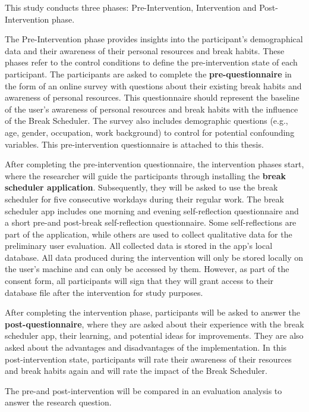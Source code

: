 \documentclass{hasel_thesis}
\begin{document}
This study conducts three phases: Pre-Intervention, Intervention and Post-Intervention phase. 

The Pre-Intervention phase provides insights into the participant's demographical data and their awareness of their personal resources and break habits. These phases refer to the control conditions to define the pre-intervention state of each participant. The participants are asked to complete the \textbf{pre-questionnaire} in the form of an online survey with questions about their existing break habits and awareness of personal resources. This questionnaire should represent the baseline of the user's awareness of personal resources and break habits with the influence of the Break Scheduler. The survey also includes demographic questions (e.g., age, gender, occupation, work background) to control for potential confounding variables. This pre-intervention questionnaire is attached to this thesis.

After completing the pre-intervention questionnaire, the intervention phases start, where the researcher will guide the participants through installing the \textbf{break scheduler application}. Subsequently, they will be asked to use the break scheduler for five consecutive workdays during their regular work. The break scheduler app includes one morning and evening self-reflection questionnaire and a short pre-and post-break self-reflection questionnaire. Some self-reflections are part of the application, while others are used to collect qualitative data for the preliminary user evaluation. All collected data is stored in the app's local database. All data produced during the intervention will only be stored locally on the user's machine and can only be accessed by them. However, as part of the consent form, all participants will sign that they will grant access to their database file after the intervention for study purposes.

After completing the intervention phase, participants will be asked to answer the \textbf{post-questionnaire}, where they are asked about their experience with the break scheduler app, their learning, and potential ideas for improvements. They are also asked about the advantages and disadvantages of the implementation. In this post-intervention state, participants will rate their awareness of their resources and break habits again and will rate the impact of the Break Scheduler.

The pre-and post-intervention will be compared in an evaluation analysis to answer the research question.
\end{document}
